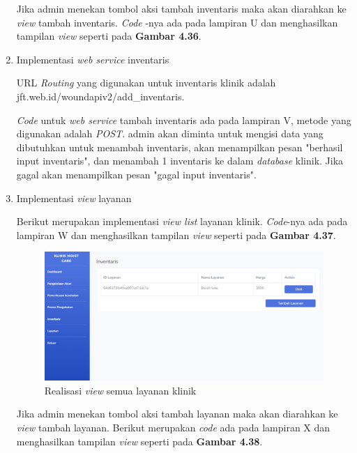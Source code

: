 \begin{enumerate}
	Jika admin menekan tombol aksi tambah inventaris maka akan diarahkan ke \emph{view} tambah inventaris. \emph{Code} -nya ada pada lampiran U dan menghasilkan tampilan \emph{view} seperti pada \textbf{Gambar 4.36}.
	
	\item Implementasi \emph{web service} inventaris
	
	URL \emph{Routing} yang digunakan untuk inventaris klinik adalah jft.web.id/woundapiv2/add\_inventaris.
	
	\emph{Code} untuk \emph{web service} tambah inventaris ada pada lampiran V, metode yang digunakan adalah \emph{POST}. admin akan diminta untuk mengisi data yang dibutuhkan untuk menambah inventaris, akan menampilkan pesan "berhasil input inventaris", dan menambah 1 inventaris ke dalam \emph{database} klinik. Jika gagal akan menampilkan pesan "gagal input inventaris".
	
	\item Implementasi \emph{view} layanan
	
	Berikut merupakan implementasi \emph{view list} layanan klinik. \emph{Code}-nya ada pada lampiran W dan menghasilkan tampilan \emph{view} seperti pada \textbf{Gambar 4.37}.
	
	\begin{figure}[H]
		\centering
		\includegraphics[width=14cm]{gambar/layanan_view.png}
		\caption{Realisasi \emph{view} semua layanan klinik} 
		\label{Gambar:usecaseadminjurnalpertama}
	\end{figure}
	
	Jika admin menekan tombol aksi tambah layanan maka akan diarahkan ke \emph{view} tambah layanan. Berikut merupakan \emph{code} ada pada lampiran X dan menghasilkan tampilan \emph{view} seperti pada \textbf{Gambar 4.38}.
	

\end{enumerate}
